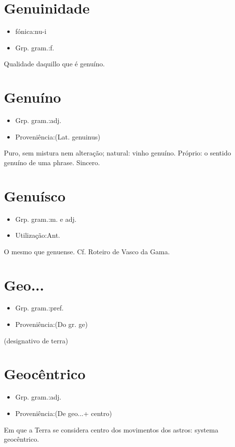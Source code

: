 \section{Genuinidade}
\begin{itemize}
\item {fónica:nu-i}
\end{itemize}
\begin{itemize}
\item {Grp. gram.:f.}
\end{itemize}
Qualidade daquillo que é genuíno.
\section{Genuíno}
\begin{itemize}
\item {Grp. gram.:adj.}
\end{itemize}
\begin{itemize}
\item {Proveniência:(Lat. \textunderscore genuinus\textunderscore )}
\end{itemize}
Puro, sem mistura nem alteração; natural: \textunderscore vinho genuíno\textunderscore .
Próprio: \textunderscore o sentido genuíno de uma phrase\textunderscore .
Sincero.
\section{Genuísco}
\begin{itemize}
\item {Grp. gram.:m.  e  adj.}
\end{itemize}
\begin{itemize}
\item {Utilização:Ant.}
\end{itemize}
O mesmo que \textunderscore genuense\textunderscore . Cf. \textunderscore Roteiro de Vasco da Gama\textunderscore .
\section{Geo...}
\begin{itemize}
\item {Grp. gram.:pref.}
\end{itemize}
\begin{itemize}
\item {Proveniência:(Do gr. \textunderscore ge\textunderscore )}
\end{itemize}
(designativo de \textunderscore terra\textunderscore )
\section{Geocêntrico}
\begin{itemize}
\item {Grp. gram.:adj.}
\end{itemize}
\begin{itemize}
\item {Proveniência:(De \textunderscore geo...\textunderscore  + \textunderscore centro\textunderscore )}
\end{itemize}
Em que a Terra se considera centro dos movimentos dos astros: \textunderscore systema geocêntrico\textunderscore .
